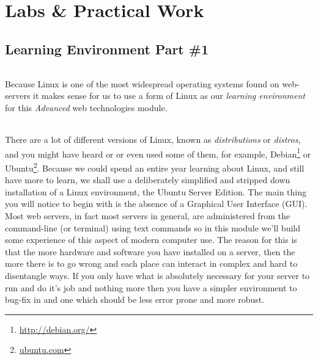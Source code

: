 \documentclass[12pt, a4paper, oneside]{book}
\begin{document}








\part{Labs \& Practical Work}
\chapter{Learning Environment Part \#1}
\label{lab1}
\paragraph{} Because Linux is one of the most widespread operating systems found on web-servers it makes sense for us to use a form of Linux as our \emph{learning environment} for this \emph{Advanced} web technologies module. 

\paragraph{} There are a lot of different versions of Linux, known as \emph{distributions} or \emph{distros}, and you might have heard or or even used some of them, for example, Debian\footnote{\url{http://debian.org/}} or Ubuntu\footnote{\url{ubuntu.com}}. Because we could spend an entire year learning about Linux, and still have more to learn, we shall use a deliberately simplified and stripped down installation of a Linux environment, the Ubuntu Server Edition. The main thing you will notice to begin with is the absence of a Graphical User Interface (GUI). Most web servers, in fact most servers in general, are administered from the command-line (or terminal) using text commands so in this module we'll build some experience of this aspect of modern computer use. The reason for this is that the more hardware and software you have installed on a server, then the more there is to go wrong and each place can interact in complex and hard to disentangle ways. If you only have what is absolutely necessary for your server to run and do it's job and nothing more then you have a simpler environment to bug-fix in and one which should be less error prone and more robust.
\end{document}
